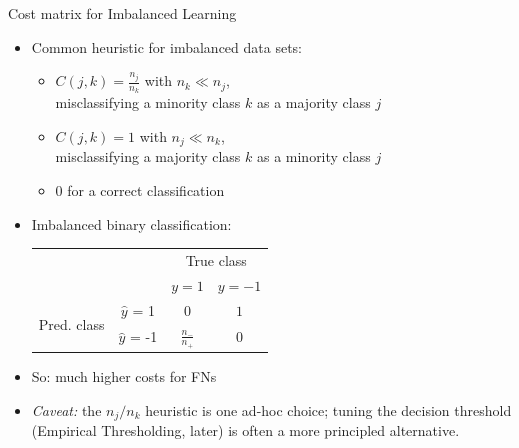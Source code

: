 \documentclass[11pt,compress,t,notes=noshow, xcolor=table]{beamer}
\begin{document}
\begin{frame}{Cost matrix for Imbalanced Learning}
		\begin{itemize}			
	 
			\item Common heuristic for imbalanced data sets: 
	
			\begin{itemize}
                \item $C(j,k) = \frac{n_j}{n_k}$ with $n_k  \ll n_j$,\\
                misclassifying a minority class $k$ as a majority class $j$
		
				\item $C(j,k) = 1$ with $n_j \ll n_k$,\\
    misclassifying a majority class $k$ as a minority class $j$
			
				\item 0 for a correct classification 
			
			\end{itemize}
\vspace{1cm}
    		\item Imbalanced binary classification: \\
            \begin{table}[]
                \centering
                \begin{tabular}{cc|cc}
                    & &\multicolumn{2}{c}{True class} \\
                    & & $y=1$ & $y=-1$  \\
                    \hline
                    \multirow{2}{*}{\parbox{0.5cm}{Pred. class}}& $\hat y$ = 1     & $0$                & $ 1 $\\
                    & $\hat y$ = -1 & $ \frac{n_-}{n_+} $              &  $0$   \\
                \end{tabular}
            \end{table}
    		

            \item So: much higher costs for FNs

            \item \footnotesize \emph{Caveat:} the $n_j/n_k$ heuristic is one ad-hoc choice; tuning the decision threshold (Empirical Thresholding, later) is often a more principled alternative.
        \end{itemize}
		
\end{frame}
\end{document}

